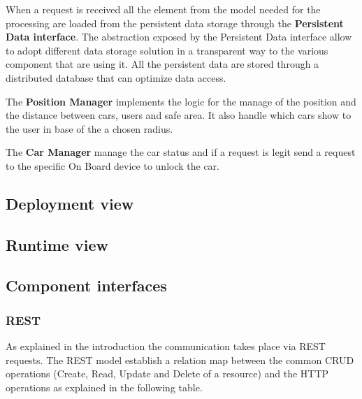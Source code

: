 When a request is received all the element from the model needed for the processing are loaded from the persistent data storage through the \textbf{Persistent Data interface}. The abstraction exposed by the Persistent Data interface allow to adopt different data storage solution in a transparent way to the various component that are using it. All the persistent data are stored through a distributed database that can optimize data access.

The \textbf{Position Manager} implements the logic for the manage of the position and the distance between cars, users and safe area. It also handle which cars show to the user in base of the a chosen radius.

The \textbf{Car Manager} manage the car status and if a request is legit send a request to the specific On Board device to unlock the car.


\newpage

\subsection{Deployment view}

\subsection{Runtime view}


\newpage

\subsection{Component interfaces} 
\subsubsection{REST}
As explained in the introduction the communication takes place via REST requests. The REST model establish a relation map between the common CRUD operations (Create, Read, Update and Delete of a resource) and the HTTP operations as explained in the following table.

